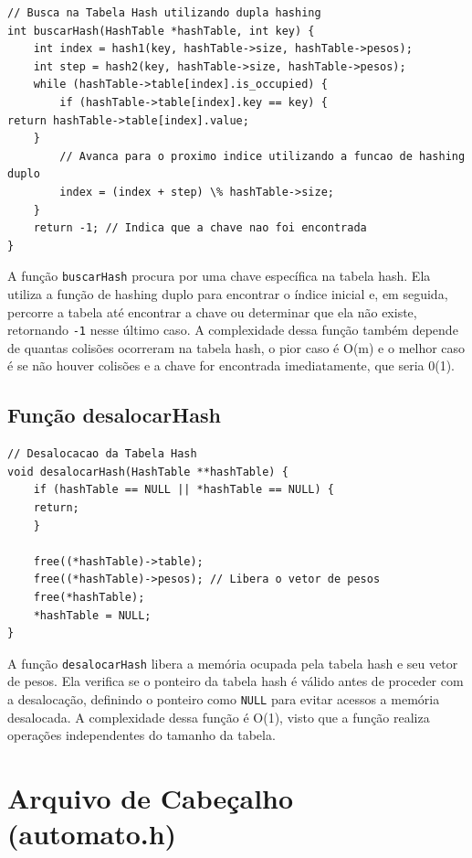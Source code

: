 \documentclass{article}
\begin{document}
\begin{lstlisting}[caption={},label={lst:cod1},language={[x86masm]Assembler}]
// Busca na Tabela Hash utilizando dupla hashing
int buscarHash(HashTable *hashTable, int key) {
    int index = hash1(key, hashTable->size, hashTable->pesos);
    int step = hash2(key, hashTable->size, hashTable->pesos);
    while (hashTable->table[index].is_occupied) {
        if (hashTable->table[index].key == key) {
return hashTable->table[index].value;
    }
        // Avanca para o proximo indice utilizando a funcao de hashing duplo
        index = (index + step) \% hashTable->size;
    }
    return -1; // Indica que a chave nao foi encontrada
}
\end{lstlisting}
\par A função \verb|buscarHash| procura por uma chave específica na tabela hash. Ela utiliza a função de hashing duplo para encontrar o índice inicial e, em seguida, percorre a tabela até encontrar a chave ou determinar que ela não existe, retornando \verb|-1| nesse último caso.  A complexidade dessa função também depende de quantas colisões ocorreram na tabela hash, o pior caso é O(m) e o melhor caso é se não houver colisões e a chave for encontrada imediatamente, que seria 0(1).

\subsection{Função desalocarHash}
\begin{lstlisting}[caption={},label={lst:cod1},language={[x86masm]Assembler}]
// Desalocacao da Tabela Hash
void desalocarHash(HashTable **hashTable) {
    if (hashTable == NULL || *hashTable == NULL) {
    return;
    }
    
    free((*hashTable)->table);
    free((*hashTable)->pesos); // Libera o vetor de pesos
    free(*hashTable);
    *hashTable = NULL;
}
\end{lstlisting}

\par A função \verb|desalocarHash| libera a memória ocupada pela tabela hash e seu vetor de pesos. Ela verifica se o ponteiro da tabela hash é válido antes de proceder com a desalocação, definindo o ponteiro como \verb|NULL| para evitar acessos a memória desalocada. A complexidade dessa função é O(1), visto que a função realiza operações independentes do tamanho da tabela.

\section{Arquivo de Cabeçalho (automato.h)}
\end{document}
